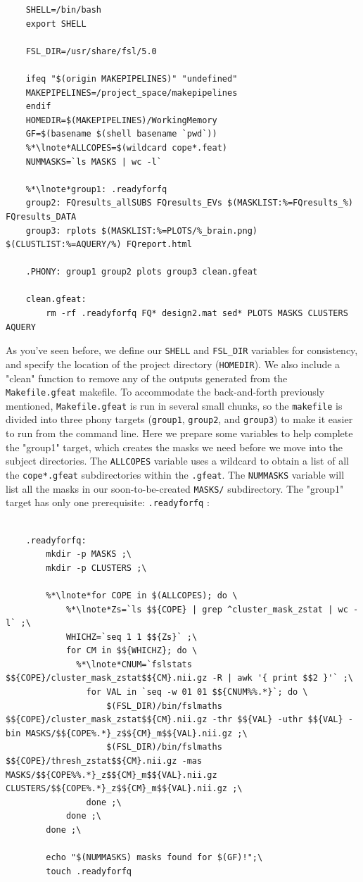 \begin{lstlisting}
	SHELL=/bin/bash
	export SHELL
	
	FSL_DIR=/usr/share/fsl/5.0
	
	ifeq "$(origin MAKEPIPELINES)" "undefined"
	MAKEPIPELINES=/project_space/makepipelines
	endif
	HOMEDIR=$(MAKEPIPELINES)/WorkingMemory
	GF=$(basename $(shell basename `pwd`))
	%*\lnote*ALLCOPES=$(wildcard cope*.feat) 
	NUMMASKS=`ls MASKS | wc -l`
	
	%*\lnote*group1: .readyforfq
	group2: FQresults_allSUBS FQresults_EVs $(MASKLIST:%=FQresults_%) FQresults_DATA
	group3: rplots $(MASKLIST:%=PLOTS/%_brain.png) $(CLUSTLIST:%=AQUERY/%) FQreport.html
	
	.PHONY: group1 group2 plots group3 clean.gfeat 
	
	clean.gfeat:
		rm -rf .readyforfq FQ* design2.mat sed* PLOTS MASKS CLUSTERS AQUERY
\end{lstlisting}
As you've seen before, we define our \texttt{SHELL} and \texttt{FSL_DIR} variables for consistency, and specify the location of the project directory (\texttt{HOMEDIR}). We also include a "clean" function to remove any of the outputs generated from the \texttt{Makefile.gfeat} makefile. To accommodate the back-and-forth previously mentioned, \texttt{Makefile.gfeat} is run in several small chunks, so the  \texttt{makefile} is divided into three phony targets (\texttt{group1}, \texttt{group2}, and \texttt{group3}) to make it easier to run from the command line. Here we prepare some variables to help \maken{} complete the "group1" target, which creates the masks we need before we move into the subject directories.  The \texttt{ALLCOPES} variable uses a wildcard to obtain a list of all the \texttt{cope*.gfeat} subdirectories within the \texttt{.gfeat}. The \texttt{NUMMASKS} variable will list all the masks in our soon-to-be-created \texttt{MASKS/} subdirectory.  The "group1" target has only one prerequisite: \texttt{.readyforfq} :

\begin{lstlisting}

	.readyforfq:
		mkdir -p MASKS ;\
		mkdir -p CLUSTERS ;\
		
		%*\lnote*for COPE in $(ALLCOPES); do \
			%*\lnote*Zs=`ls $${COPE} | grep ^cluster_mask_zstat | wc -l` ;\
			WHICHZ=`seq 1 1 $${Zs}` ;\
			for CM in $${WHICHZ}; do \
			  %*\lnote*CNUM=`fslstats $${COPE}/cluster_mask_zstat$${CM}.nii.gz -R | awk '{ print $$2 }'` ;\
				for VAL in `seq -w 01 01 $${CNUM%%.*}`; do \
					$(FSL_DIR)/bin/fslmaths $${COPE}/cluster_mask_zstat$${CM}.nii.gz -thr $${VAL} -uthr $${VAL} -bin MASKS/$${COPE%.*}_z$${CM}_m$${VAL}.nii.gz ;\
					$(FSL_DIR)/bin/fslmaths $${COPE}/thresh_zstat$${CM}.nii.gz -mas MASKS/$${COPE%%.*}_z$${CM}_m$${VAL}.nii.gz CLUSTERS/$${COPE%.*}_z$${CM}_m$${VAL}.nii.gz ;\
				done ;\
			done ;\
		done ;\
		
		echo "$(NUMMASKS) masks found for $(GF)!";\
		touch .readyforfq
\end{lstlisting}

